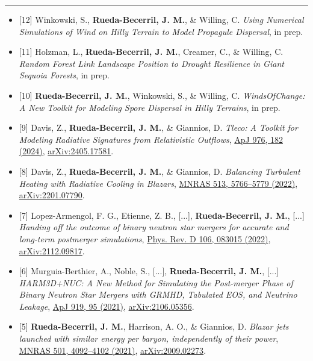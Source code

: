 \documentclass[10pt,letterpaper]{article}
\newcommand{\cvsection}[1]{%
  \vspace{5pt}{\large\bfseries #1}\par\nopagebreak\vspace{2pt}\hrule
  \nopagebreak\vspace{3pt}\nopagebreak}
\newcommand{\cvsubsection}[1]{%
  \vspace{3pt}{\bfseries #1}\par\nopagebreak\vspace{2pt}\nopagebreak}
\begin{document}
\cvsection{Publications}
\cvsubsection{Articles (9 published, 3 first-author; 3 in preparation)}
\begin{itemize}[label={}, leftmargin=1.5em, itemindent=-1.5em, labelwidth=0pt, labelsep=0pt]
  \item{} [12] Winkowski, S., \textbf{Rueda-Becerril, J. M.}, \& Willing, C. \textit{Using Numerical Simulations of Wind on Hilly Terrain to Model Propagule Dispersal}, in prep.
  \item{} [11] Holzman, L., \textbf{Rueda-Becerril, J. M.}, Creamer, C., \& Willing, C. \textit{Random Forest Link Landscape Position to Drought Resilience in Giant Sequoia Forests}, in prep.
  \item{} [10] \textbf{Rueda-Becerril, J. M.}, Winkowski, S., \& Willing, C. \textit{WindsOfChange: A New Toolkit for Modeling Spore Dispersal in Hilly Terrains}, in prep.
  \item{} [9] Davis, Z., \textbf{Rueda-Becerril, J. M.}, \& Giannios, D. \textit{Tleco: A Toolkit for Modeling Radiative Signatures from Relativistic Outflows}, \href{https://doi.org/10.3847/1538-4357/ad8bc2}{ApJ 976, 182 (2024)}, \href{https://arxiv.org/abs/2405.17581}{arXiv:2405.17581}.
  \item{} [8] Davis, Z., \textbf{Rueda-Becerril, J. M.}, \& Giannios, D. \textit{Balancing Turbulent Heating with Radiative Cooling in Blazars}, \href{https://doi.org/10.1093/mnras/stac1282}{MNRAS 513, 5766–5779 (2022)}, \href{https://arxiv.org/abs/2201.07790}{arXiv:2201.07790}.
  \item{} [7] Lopez-Armengol, F. G., Etienne, Z. B., [...], \textbf{Rueda-Becerril, J. M.}, [...] \textit{Handing off the outcome of binary neutron star mergers for accurate and long-term postmerger simulations}, \href{https://doi.org/10.1103/PhysRevD.106.083015}{Phys. Rev. D 106, 083015 (2022)}, \href{https://arxiv.org/abs/2112.09817}{arXiv:2112.09817}.
  \item{} [6] Murguia-Berthier, A., Noble, S., [...], \textbf{Rueda-Becerril, J. M.}, [...] \textit{HARM3D+NUC: A New Method for Simulating the Post-merger Phase of Binary Neutron Star Mergers with GRMHD, Tabulated EOS, and Neutrino Leakage}, \href{https://doi.org/10.3847/1538-4357/ac1119}{ApJ 919, 95 (2021)}, \href{https://arxiv.org/abs/2106.05356}{arXiv:2106.05356}.
  \item{} [5] \textbf{Rueda-Becerril, J. M.}, Harrison, A. O., \& Giannios, D. \textit{Blazar jets launched with similar energy per baryon, independently of their power}, \href{https://doi.org/10.1093/mnras/staa3925}{MNRAS 501, 4092–4102 (2021)}, \href{https://arxiv.org/abs/2009.02273}{arXiv:2009.02273}.

\end{itemize}
\end{document}
